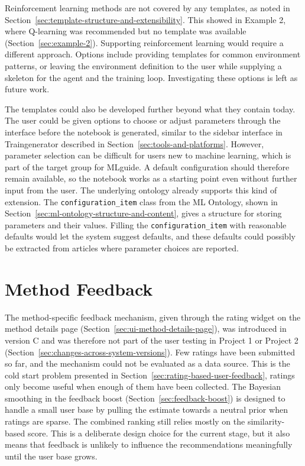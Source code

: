 Reinforcement learning methods are not covered by any 
templates, as noted in 
Section~\ref{sec:template-structure-and-extensibility}. This 
showed in Example 2, where Q-learning was recommended but no 
template was available (Section~\ref{sec:example-2}). 
Supporting reinforcement learning would require a different 
approach. Options include providing templates for common 
environment patterns, or leaving the environment definition 
to the user while supplying a skeleton for the agent and the 
training loop. Investigating these options is left as future 
work.

The templates could also be developed further beyond what 
they contain today. The user could 
be given options to choose or adjust parameters through the 
interface before the notebook is generated, similar to the 
sidebar interface in Traingenerator described in 
Section~\ref{sec:tools-and-platforms}. However, parameter selection 
can be difficult for users new to machine learning, 
which is part of the target group for MLguide. A default 
configuration should therefore remain available, so the 
notebook works as a starting point even without further 
input from the user. The underlying ontology already supports 
this kind of extension. The \texttt{configuration\_item} 
class from the ML Ontology, shown in 
Section~\ref{sec:ml-ontology-structure-and-content}, gives a 
structure for storing parameters and their values. Filling 
the \texttt{configuration\_item} with reasonable defaults would let 
the system suggest defaults, and these 
defaults could possibly be extracted from articles where parameter 
choices are reported. 

\section{Method Feedback}
\label{sec:method-feedback}

The method-specific feedback mechanism, given through the 
rating widget on the method details page 
(Section~\ref{sec:ui-method-details-page}), was introduced 
in version C and was therefore not part of the user testing 
in Project 1 or Project 2 
(Section~\ref{sec:changes-across-system-versions}). Few 
ratings have been submitted so far, and the mechanism could 
not be evaluated as a data source. This is the cold start 
problem presented in 
Section~\ref{sec:rating-based-user-feedback},
ratings only become useful when enough of them have been 
collected. The Bayesian smoothing in the feedback boost 
(Section~\ref{sec:feedback-boost}) is designed to handle a 
small user base by pulling the estimate towards a neutral 
prior when ratings are sparse. The combined ranking still 
relies mostly on the similarity-based score. This is 
a deliberate design choice for the current stage, but it 
also means that feedback is unlikely to influence the 
recommendations meaningfully until the user base grows.

